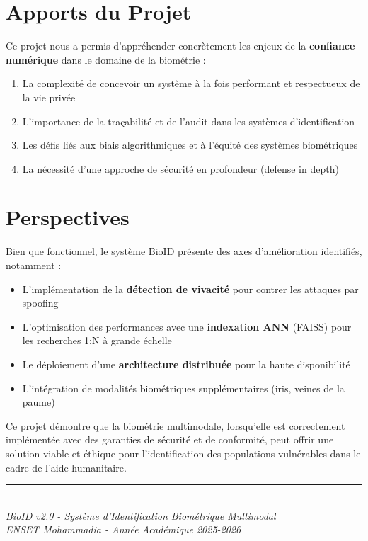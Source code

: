 \documentclass[12pt,a4paper]{report}
\begin{document}
\section*{Apports du Projet}

Ce projet nous a permis d'appréhender concrètement les enjeux de la \textbf{confiance numérique} dans le domaine de la biométrie :

\begin{enumerate}
    \item La complexité de concevoir un système à la fois performant et respectueux de la vie privée
    \item L'importance de la traçabilité et de l'audit dans les systèmes d'identification
    \item Les défis liés aux biais algorithmiques et à l'équité des systèmes biométriques
    \item La nécessité d'une approche de sécurité en profondeur (defense in depth)
\end{enumerate}

\section*{Perspectives}

Bien que fonctionnel, le système BioID présente des axes d'amélioration identifiés, notamment :

\begin{itemize}
    \item L'implémentation de la \textbf{détection de vivacité} pour contrer les attaques par spoofing
    \item L'optimisation des performances avec une \textbf{indexation ANN} (FAISS) pour les recherches 1:N à grande échelle
    \item Le déploiement d'une \textbf{architecture distribuée} pour la haute disponibilité
    \item L'intégration de modalités biométriques supplémentaires (iris, veines de la paume)
\end{itemize}

\vspace{1cm}

\begin{center}
\begin{tcolorbox}[colback=bioid-green!10,colframe=bioid-green,width=0.9\textwidth]
\centering
Ce projet démontre que la biométrie multimodale, lorsqu'elle est correctement implémentée avec des garanties de sécurité et de conformité, peut offrir une solution viable et éthique pour l'identification des populations vulnérables dans le cadre de l'aide humanitaire.
\end{tcolorbox}
\end{center}

\vfill

\begin{center}
    \rule{0.5\textwidth}{0.4pt}\\[0.5cm]
    \textit{BioID v2.0 - Système d'Identification Biométrique Multimodal}\\[0.2cm]
    \textit{ENSET Mohammadia - Année Académique 2025-2026}
\end{center}
\end{document}
